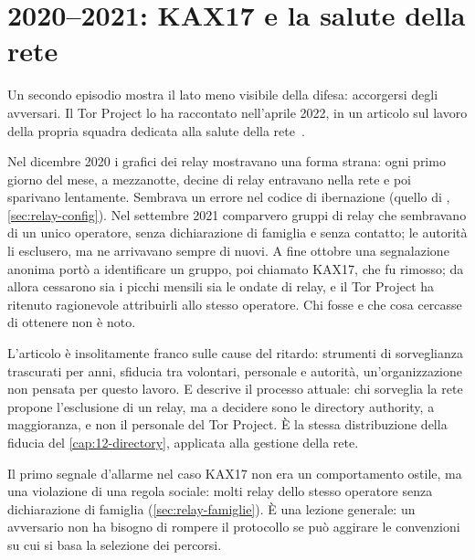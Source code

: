 \section{2020--2021: KAX17 e la salute della rete}\label{sec:casi-kax17}

Un secondo episodio mostra il lato meno visibile della difesa: accorgersi degli avversari. Il Tor Project lo ha raccontato nell'aprile 2022, in un articolo sul lavoro della propria squadra dedicata alla salute della rete~\cite{torblog2022badrelays}.

Nel dicembre 2020 i grafici dei relay mostravano una forma strana: ogni primo giorno del mese, a mezzanotte, decine di relay entravano nella rete e poi sparivano lentamente. Sembrava un errore nel codice di ibernazione (quello di , \cref{sec:relay-config}). Nel settembre 2021 comparvero gruppi di relay che sembravano di un unico operatore, senza dichiarazione di famiglia e senza contatto; le autorità li esclusero, ma ne arrivavano sempre di nuovi. A fine ottobre una segnalazione anonima portò a identificare un gruppo, poi chiamato KAX17, che fu rimosso; da allora cessarono sia i picchi mensili sia le ondate di relay, e il Tor Project ha ritenuto ragionevole attribuirli allo stesso operatore. Chi fosse e che cosa cercasse di ottenere non è noto.

L'articolo è insolitamente franco sulle cause del ritardo: strumenti di sorveglianza trascurati per anni, sfiducia tra volontari, personale e autorità, un'organizzazione non pensata per questo lavoro. E descrive il processo attuale: chi sorveglia la rete propone l'esclusione di un relay, ma a decidere sono le directory authority, a maggioranza, e non il personale del Tor Project. È la stessa distribuzione della fiducia del \cref{cap:12-directory}, applicata alla gestione della rete.

\begin{approfondimento}
Il primo segnale d'allarme nel caso KAX17 non era un comportamento ostile, ma una violazione di una regola sociale: molti relay dello stesso operatore senza dichiarazione di famiglia (\cref{sec:relay-famiglie}). È una lezione generale: un avversario non ha bisogno di rompere il protocollo se può aggirare le convenzioni su cui si basa la selezione dei percorsi.
\end{approfondimento}

